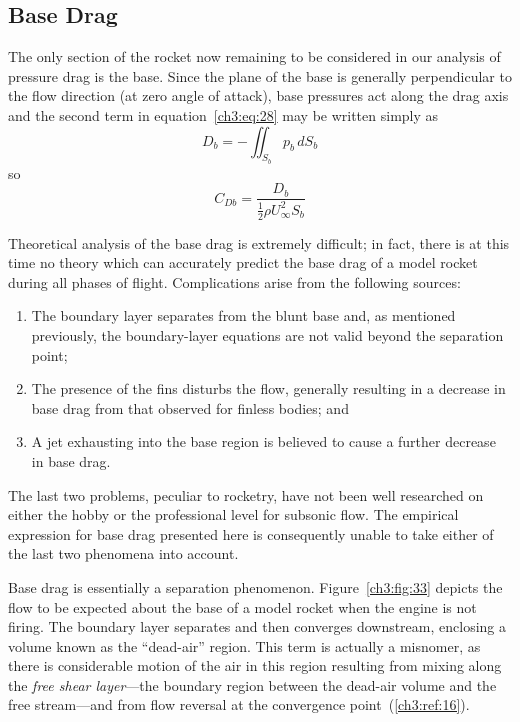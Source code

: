\subsection{Base Drag}\label{ch3:sec:4.4}

The only section of the rocket now remaining to be considered in our analysis
of pressure drag is the base. Since the plane of the base is generally
perpendicular to the flow direction (at zero angle of attack), base pressures
act along the drag axis and the second term in
equation~\eqref{ch3:eq:28} may be
written simply as
\begin{equation}\label{ch3:eq:121}
D_b = -\iint_{S_b} p_b\,dS_b
\end{equation}
so
\begin{equation}\label{ch3:eq:122}
C_{Db} = \frac{D_b}{\tfrac{1}{2}\rho U_\infty^2 S_b}
\end{equation}

Theoretical analysis of the base drag is extremely difficult; in fact, there
is at this time no theory which can accurately predict the base drag of a
model rocket during all phases of flight. Complications arise from the
following sources:
\begin{enumerate}[label=(\alph*),leftmargin=*]
  \item The boundary layer separates from the blunt base and, as mentioned
    previously, the boundary-layer equations are not valid beyond the
    separation point;
  \item The presence of the fins disturbs the flow, generally resulting in a
    decrease in base drag from that observed for finless bodies; and
  \item A jet exhausting into the base region is believed to cause a further
    decrease in base drag.
\end{enumerate}
The last two problems, peculiar to rocketry, have not been well researched on
either the hobby or the professional level for subsonic flow. The empirical
expression for base drag presented here is consequently unable to take either
of the last two phenomena into account.

Base drag is essentially a separation phenomenon. Figure~\ref{ch3:fig:33}
depicts the flow to be expected about the base of a model rocket when the
engine is not firing. The boundary layer separates and then converges
downstream, enclosing a volume known as the ``dead-air'' region. This term is
actually a misnomer, as there is considerable motion of the air in this region
resulting from mixing along the \emph{free shear layer}---the boundary region
between the dead-air volume and the free stream---and from flow reversal at
the convergence point~(\ref{ch3:ref:16}).

